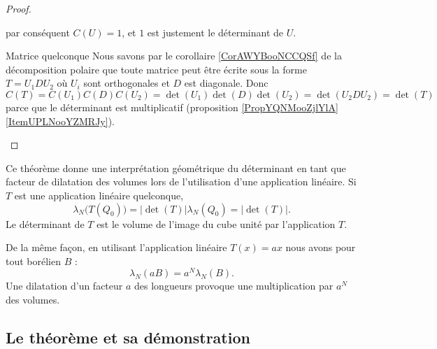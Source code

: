 \begin{proof}
\begin{subproof}
\begin{equation}
            \end{equation}
            par conséquent \( C(U)=1\), et \( 1\) est justement le déterminant de \( U\).
        \item[Matrice quelconque]
            Nous savons par le corollaire \ref{CorAWYBooNCCQSf} de la décomposition polaire que toute matrice peut être écrite sous la forme \( T=U_1DU_2\) où \( U_i\) sont orthogonales et \( D\) est diagonale. Donc \( C(T)=C(U_1)C(D)C(U_2)=\det(U_1)\det(D)\det(U_2)=\det(U_2DU_2)=\det(T)\) parce que le déterminant est multiplicatif (proposition \ref{PropYQNMooZjlYlA}\ref{ItemUPLNooYZMRJy}).
    \end{subproof}
\end{proof}

Ce théorème donne une interprétation géométrique du déterminant en tant que facteur de dilatation des volumes lors de l'utilisation d'une application linéaire. Si \( T\) est une application linéaire quelconque,
\begin{equation}
    \lambda_N\big( T(Q_0) \big)=| \det(T) |\lambda_N(Q_0)=| \det(T) |.
\end{equation}
Le déterminant de \( T\) est le volume de l'image du cube unité par l'application \( T\).

De la même façon, en utilisant l'application linéaire \( T(x)=ax\) nous avons pour tout borélien \( B\) :
\begin{equation}
    \lambda_N(aB)=a^N\lambda_N(B).
\end{equation}
Une dilatation d'un facteur \( a\) des longueurs provoque une multiplication par \( a^N\) des volumes.

\subsection{Le théorème et sa démonstration}

